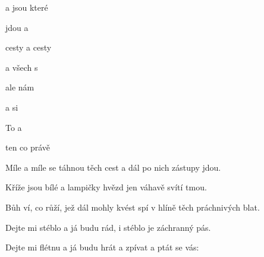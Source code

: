 

\zs
{} a  jsou  které 

jdou  a  

 cesty  a  cesty 

a  všech s  

 ale  nám  

a  si  
\ks

\zr
To   a  

ten  co  právě 
\kr

\zs
Míle a míle se táhnou těch cest a dál po nich zástupy jdou.

Kříže jsou bílé a lampičky hvězd jen váhavě svítí tmou.

Bůh ví, co růží, jež dál mohly kvést spí v hlíně těch práchnivých blat.
\ks

\zr\kr

\zs
Dejte mi stéblo a já budu rád, i stéblo je záchranný pás.

Dejte mi flétnu a já budu hrát a zpívat a ptát se vás:

\ks

\zr\kr

\kp

